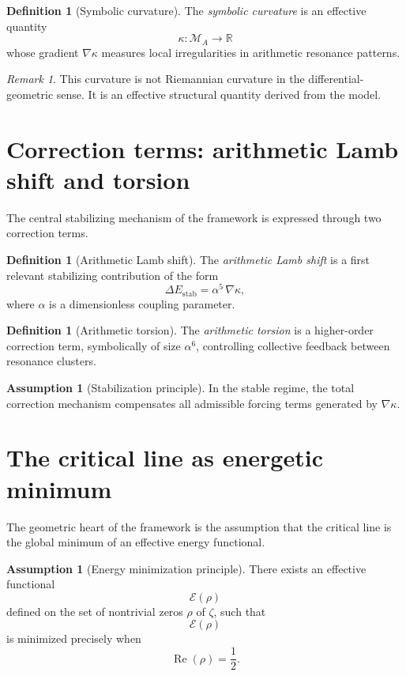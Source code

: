 \documentclass[11pt,a4paper]{amsart}
\theoremstyle{plain}
\theoremstyle{definition}
\newtheorem{definition}[theorem]{Definition}
\newtheorem{assumption}[theorem]{Assumption}
\theoremstyle{remark}
\newtheorem{remark}[theorem]{Remark}
\newcommand{\RR}{\mathbb{R}}
\newcommand{\RePart}{\operatorname{Re}}
\newcommand{\grad}{\nabla}
\newcommand{\MA}{\mathcal{M}_A}
\newcommand{\kappaF}{\kappa}
\newcommand{\zetaR}{\zeta}
\newcommand{\Eeff}{\mathcal{E}}
\begin{document}
	\begin{definition}[Symbolic curvature]
		The \emph{symbolic curvature} is an effective quantity
		\[
		\kappaF:\MA\to\RR
		\]
		whose gradient $\grad\kappaF$ measures local irregularities in arithmetic resonance patterns.
	\end{definition}
	
	\begin{remark}
		This curvature is not Riemannian curvature in the differential-geometric sense. It is an effective structural quantity derived from the model.
	\end{remark}
	
	\section{Correction terms: arithmetic Lamb shift and torsion}
	
	The central stabilizing mechanism of the framework is expressed through two correction terms.
	
	\begin{definition}[Arithmetic Lamb shift]
		The \emph{arithmetic Lamb shift} is a first relevant stabilizing contribution of the form
		\[
		\Delta E_{\mathrm{stab}}=\alpha^5\,\grad\kappaF,
		\]
		where $\alpha$ is a dimensionless coupling parameter.
	\end{definition}
	
	\begin{definition}[Arithmetic torsion]
		The \emph{arithmetic torsion} is a higher-order correction term, symbolically of size $\alpha^6$, controlling collective feedback between resonance clusters.
	\end{definition}
	
	\begin{assumption}[Stabilization principle]
		In the stable regime, the total correction mechanism compensates all admissible forcing terms generated by $\grad\kappaF$.
	\end{assumption}
	
	\section{The critical line as energetic minimum}
	
	The geometric heart of the framework is the assumption that the critical line is the global minimum of an effective energy functional.
	
	\begin{assumption}[Energy minimization principle]
		There exists an effective functional
		\[
		\Eeff(\rho)
		\]
		defined on the set of nontrivial zeros $\rho$ of $\zetaR$, such that
		\[
		\Eeff(\rho)
		\]
		is minimized precisely when
		\[
		\RePart(\rho)=\frac12.
		\]
	\end{assumption}
	
\end{document}
